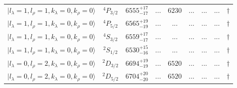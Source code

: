 \begin{tabular}{c c| c c c c c c c}
$\vert l_{\lambda}\!\!=\!1, l_{\rho}\!\!=\!1, k_{\lambda}\!\!=\!0, k_{\rho}\!\!=\!0 \rangle$ & $^{4}P_{3/2}$ & $6555^{+17}_{-17}$ & ... & $6230$ & ... & ... & ... & $\dagger$ \\ 
$\vert l_{\lambda}\!\!=\!1, l_{\rho}\!\!=\!1, k_{\lambda}\!\!=\!0, k_{\rho}\!\!=\!0 \rangle$ & $^{4}P_{5/2}$ & $6565^{+19}_{-19}$ & ... & ... & ... & ... & ... & $\dagger$ \\ 
$\vert l_{\lambda}\!\!=\!1, l_{\rho}\!\!=\!1, k_{\lambda}\!\!=\!0, k_{\rho}\!\!=\!0 \rangle$ & $^{4}S_{3/2}$ & $6559^{+17}_{-17}$ & ... & ... & ... & ... & ... & $\dagger$ \\ 
$\vert l_{\lambda}\!\!=\!1, l_{\rho}\!\!=\!1, k_{\lambda}\!\!=\!0, k_{\rho}\!\!=\!0 \rangle$ & $^{2}S_{1/2}$ & $6530^{+15}_{-16}$ & ... & ... & ... & ... & ... & $\dagger$ \\ 
$\vert l_{\lambda}\!\!=\!0, l_{\rho}\!\!=\!2, k_{\lambda}\!\!=\!0, k_{\rho}\!\!=\!0 \rangle$ & $^{2}D_{3/2}$ & $6694^{+19}_{-19}$ & ... & $6520$ & ... & ... & ... & $\dagger$ \\ 
$\vert l_{\lambda}\!\!=\!0, l_{\rho}\!\!=\!2, k_{\lambda}\!\!=\!0, k_{\rho}\!\!=\!0 \rangle$ & $^{2}D_{5/2}$ & $6704^{+20}_{-20}$ & ... & $6520$ & ... & ... & ... & $\dagger$ \\ 
\hline \hline
\end{tabular}
